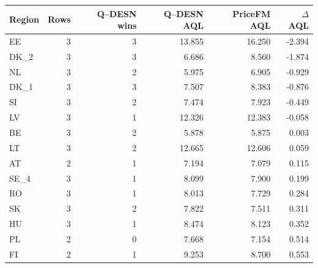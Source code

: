 \begin{tabular}{lrrrrr}
\toprule
Region & Rows & Q--DESN wins & Q--DESN AQL & PriceFM AQL & $\Delta$ AQL
\\
\midrule
EE & 3 & 3 & 13.855 & 16.250 & -2.394
\\
DK\_2 & 3 & 3 & 6.686 & 8.560 & -1.874
\\
NL & 3 & 2 & 5.975 & 6.905 & -0.929
\\
DK\_1 & 3 & 3 & 7.507 & 8.383 & -0.876
\\
SI & 3 & 2 & 7.474 & 7.923 & -0.449
\\
LV & 3 & 1 & 12.326 & 12.383 & -0.058
\\
BE & 3 & 2 & 5.878 & 5.875 & 0.003
\\
LT & 3 & 2 & 12.665 & 12.606 & 0.059
\\
AT & 2 & 1 & 7.194 & 7.079 & 0.115
\\
SE\_4 & 3 & 1 & 8.099 & 7.900 & 0.199
\\
RO & 3 & 1 & 8.013 & 7.729 & 0.284
\\
SK & 3 & 2 & 7.822 & 7.511 & 0.311
\\
HU & 3 & 1 & 8.474 & 8.123 & 0.352
\\
PL & 2 & 0 & 7.668 & 7.154 & 0.514
\\
FI & 2 & 1 & 9.253 & 8.700 & 0.553
\\
\bottomrule
\end{tabular}
